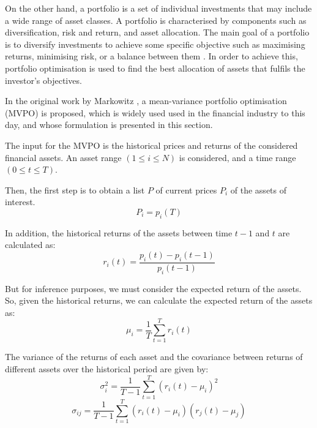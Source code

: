 \documentclass[prx,twocolumn,floatfix,superscriptaddress,longbibliography]{revtex4-1}
\begin{document}
On the other hand, a portfolio is a set of individual investments that may include a wide range of asset classes. A portfolio is characterised by components such as diversification, risk and return, and asset allocation. The main goal of a portfolio is to diversify investments to achieve some specific objective such as maximising returns, minimising risk, or a balance between them \cite{Wilmott2007}. 
In order to achieve this, portfolio optimisation is used to find the best allocation of assets that fulfils the investor's objectives.

In the original work by Markowitz \cite{Markowitz1952}, a mean-variance portfolio optimisation (MVPO) is proposed, which is widely used used in the financial industry to this day, and whose formulation is presented in this section.

The input for the MVPO is the historical prices and returns of the considered financial assets. An asset range $(1 \leq i \leq N)$ is considered, and a time range $(0 \leq t \leq T)$. 

Then, the first step is to obtain a list $P$ of current prices $P_i$  of the assets of interest.
\begin{equation}
  \label{eq:1}
  P_i = p_i(T)
\end{equation}

In addition, the historical returns of the assets between time $t-1$ and $t$ are calculated as:
\begin{equation}
  \label{eq:2}
  r_i(t) = \frac{p_i(t) - p_i(t-1)}{p_i(t-1)}
\end{equation}

But for inference purposes, we must consider the expected return of the assets. So, given the historical returns, we can calculate the expected return of the assets as:
\begin{equation}
  \label{eq:3}
  \mu_i = \frac{1}{T} \sum_{t=1}^{T} r_i(t)
\end{equation}

The variance of the returns of each asset and the covariance between returns of different assets over the historical period are given by:
\begin{equation}
  \label{eq:4}
  \sigma_i^2 = \frac{1}{T-1} \sum_{t=1}^{T} (r_i(t) - \mu_i)^2
\end{equation}
\begin{equation}
  \label{eq:5}
  \sigma_{ij} = \frac{1}{T-1} \sum_{t=1}^{T} (r_i(t) - \mu_i)(r_j(t) - \mu_j)
\end{equation}
\end{document}
